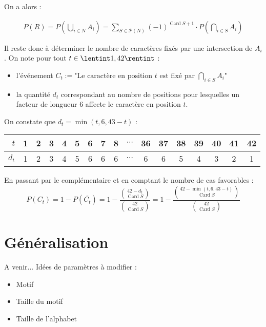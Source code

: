 \documentclass{hibiscus}
\DeclareMathOperator{\Card}{Card}
\begin{document}
\par \medskip On a alors :

\begin{equation*}
\begin{aligned}
P(R) = P \left( \bigcup_{i \in N}{A_i} \right)
= \sum_{S \in \mathcal{P}(N)}{(-1)^{\Card S + 1} \cdot P \left( \bigcap_{i \in S}{A_i} \right)}
\end{aligned}
\end{equation*}

\par \medskip Il reste donc à déterminer le nombre de caractères fixés par une intersection de $A_i$. On note pour tout $t \in \lentint 1, 42 \rentint$ :
\begin{itemize}
\item l'événement $C_t := \text{"Le caractère en position $t$ est fixé par $\bigcap_{i \in S}{A_i}$"}$
\item la quantité $d_t$ correspondant au nombre de positions pour lesquelles un facteur de longueur 6 affecte le caractère en position $t$.
\end{itemize}

\par \medskip On constate que $d_t = \min(t, 6, 43 - t)$ :
\begin{center}\begin{tabular}{|r|c|c|c|c|c|c|c|c|c|c|c|c|c|c|c|c|}
\hline
$t$ & 1 & 2 & 3 & 4 & 5 & 6 & 7 & 8 & $\cdots$ & 36 & 37 & 38 & 39 & 40 & 41 & 42 \\
\hline
$d_t$ & 1 & 2 & 3 & 4 & 5 & 6 & 6 & 6 & $\cdots$ & 6 & 6 & 5 & 4 & 3 & 2 & 1 \\
\hline
\end{tabular}\end{center}

\par \medskip En passant par le complémentaire et en comptant le nombre de cas favorables :
$$
P(C_t) = 1 - P(\overline{C_t}) = 1 - \frac{\binom{42 - d_t}{\Card S}}{\binom{42}{\Card S}}
= 1 - \frac{\binom{42 - \min(t, 6, 43 - t)}{\Card S}}{\binom{42}{\Card S}}
$$

\section{Généralisation}

\par \medskip A venir... Idées de paramètres à modifier :
\begin{itemize}
\item Motif
\item Taille du motif
\item Taille de l'alphabet
\end{itemize}
\end{document}
